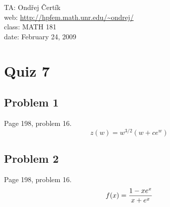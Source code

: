 \documentclass[10pt]{article}
\begin{document}
\noindent TA: Ondřej Čertík\\
web: \url{http://hpfem.math.unr.edu/~ondrej/}\\
class: MATH 181\\
date: February 24, 2009

\section*{Quiz 7}

\subsection*{Problem 1}

Page 198, problem 16.
$$z(w) =   w ^ {3/2} (w + c e^w)$$

\subsection*{Problem 2}

Page 198, problem 16.
$$f(x) = {1-xe^x\over x+e^x}$$
\end{document}
